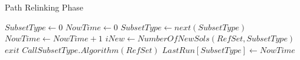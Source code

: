 \begin{algorithm}
  \hline \vspace{3pt}
  \caption{Path Relinking Phase}\label{pr_phase}
  \vspace{3pt} \hline
  \begin{algorithmic}[0]
    \State $SubsetType \gets 0$
    \State $NowTime \gets 0$
    \State $SubsetType \gets next(SubsetType)$
    \State $NowTime \gets NowTime + 1$
    \State $iNew \gets NumberOfNewSols(RefSet,SubsetType)$
    \State $exit$
    \EndIf
    \State $Call SubsetType.Algorithm(RefSet)$
    \State $LastRun[SubsetType] \gets NowTime$
    \EndWhile
    \EndProcedure
    \hline
  \end{algorithmic}
\end{algorithm}
